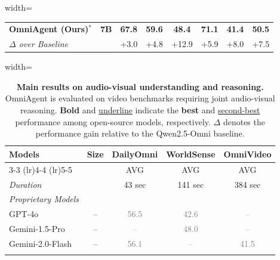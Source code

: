 \documentclass{article}
\theoremstyle{plain}
\theoremstyle{definition}
\theoremstyle{remark}
\newcommand{\gv}[1]{\textcolor{gray}{#1}}
\begin{document}
\begin{table}[t]
\begin{center}
\begin{normalsize}
\begin{adjustbox}{width=\textwidth}
\begin{tabular}{l c cc cccc}
\textbf{OmniAgent (Ours)}$^*$ & \textbf{7B} & \textbf{67.8} & \textbf{59.6} & \textbf{48.4} & \textbf{71.1} & \textbf{41.4} & \textbf{50.5} \\
\multicolumn{2}{l}{\quad \textit{$\Delta$ over Baseline}} & +3.0 & +4.8 & +12.9 & +5.9 & +8.0 & +7.5 \\
\bottomrule
\end{tabular}
\end{adjustbox}
\end{normalsize}
\end{center}
\vspace{-4mm}
\end{table}

\begin{table}[t]
\caption{\textbf{Main results on audio-visual understanding and reasoning.} OmniAgent is evaluated on video benchmarks requiring joint audio-visual reasoning. \textbf{Bold} and \underline{underline} indicate the \textbf{best} and \underline{second-best} performance among open-source models, respectively. $\Delta$ denotes the performance gain relative to the Qwen2.5-Omni baseline.}
\label{tab:audio-visual-results}
\vspace{-2mm}
\begin{center}
\begin{normalsize}
\begin{adjustbox}{width=\columnwidth}
\setlength{\tabcolsep}{5pt} 
\renewcommand{\arraystretch}{1.1}
\begin{tabular}{l c ccc}
\toprule

\multirow{3}{*}{\textbf{Models}} & \multirow{3}{*}{\textbf{Size}} & \textbf{DailyOmni} & \textbf{WorldSense} & \textbf{OmniVideo} \\
\cmidrule(lr){3-3} \cmidrule(lr){4-4} \cmidrule(lr){5-5} 

& & AVG & AVG & AVG \\
\midrule

\textit{Duration} & &  43 sec &  141 sec &  384 sec \\
\midrule

\multicolumn{5}{l}{\textit{Proprietary Models}} \\
GPT-4o~\cite{gpt4o} & -- & \gv{56.5} & \gv{42.6} & \gv{--} \\
Gemini-1.5-Pro~\cite{team2024gemini} & -- & \gv{--} & \gv{48.0} & \gv{--} \\
Gemini-2.0-Flash ~\cite{gemini} & -- & \gv{56.1} & \gv{--} & \gv{41.5} \\
\midrule \addlinespace[0.2em]


\end{tabular}
\end{adjustbox}
\end{normalsize}
\end{center}
\end{table}
\end{document}

